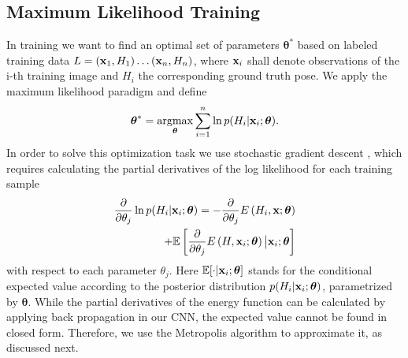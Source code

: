 \documentclass[10pt,letterpaper]{article}
\newcommand{\btheta}{\boldsymbol\theta}
\newcommand{\bx}{{\bf x}}
\newcommand{\argmax}{\operatornamewithlimits{argmax}}
\begin{document}
\subsection{Maximum Likelihood Training}
In training we want to find an optimal set of parameters $\btheta^*$ based on labeled training data $L=(\bx_1, H_1)\dots (\bx_n, H_n)$, where $\bx_i$ shall denote observations of the i-th training image and $H_i$ the corresponding ground truth pose. We apply the maximum likelihood paradigm and define  
\begin{equation} \label{eq:TrainingGoal}
	\btheta^*=\argmax_{\btheta} \sum_{i=1}^n \ln  p(H_i| \bx_i ;\btheta).
\end{equation}
In order to solve this optimization task we use stochastic gradient descent \cite{bottou1991stochastic}, which requires calculating the partial derivatives of the log likelihood for each training sample
\begin{equation} \label{eq:partial}
\begin{split}
	\frac
		{\partial }
		{\partial \theta_j} \ln  p (H_i| \bx_i ;\btheta)
	= 
	-\frac
		{\partial }
		{{\partial \theta_j}} E \left(H_i,\bx;\btheta \right) 
	\\ +\mathbb{E}\left[
	\frac
		{\partial }
		{{\partial \theta_j}} E\left(H,\bx_i;\btheta \right)
	\big| \bx_i ;\btheta \right]
\end{split}
\end{equation}
with respect to each parameter $\theta_j$. Here $\mathbb{E}[\cdot | \bx_i ;\btheta ]$ stands for the conditional expected value according to the posterior distribution $ p(H_i| \bx_i ;\btheta)$, parametrized by $\btheta$. While the partial derivatives of the energy function can be calculated by applying back propagation in our CNN, the expected value cannot be found in closed form. Therefore, we use the Metropolis algorithm \cite{metropolis} to approximate it, as discussed next.
\end{document}
